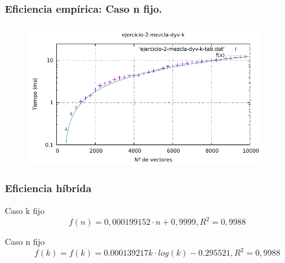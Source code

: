 \documentclass[13pt]{beamer}
\begin{document}
    \begin{frame}
        \frametitle{Eficiencia empírica: Caso n fijo.}

        \begin{figure}
            \includegraphics[width=0.9\textwidth]{img/e2-dyv-k.pdf}
        \end{figure}
    \end{frame}

    \begin{frame}
        \frametitle{Eficiencia híbrida}

        \begin{block}{Caso k fijo}
            $$f(n) = 0,000199152 \cdot n + 0,9999, R^2 = 0,9988$$
        \end{block}

        \begin{block}{Caso n fijo}
            $$f(k) = f(k) = 0.000139217 k \cdot log(k) - 0.295521, R^2 = 0,9988$$
        \end{block}

    \end{frame}
\end{document}
